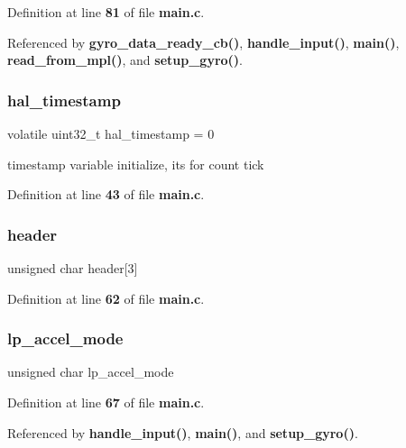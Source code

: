 Definition at line \textbf{ 81} of file \textbf{ main.\+c}.



Referenced by \textbf{ gyro\+\_\+data\+\_\+ready\+\_\+cb()}, \textbf{ handle\+\_\+input()}, \textbf{ main()}, \textbf{ read\+\_\+from\+\_\+mpl()}, and \textbf{ setup\+\_\+gyro()}.

\mbox{\label{group__eMPL_ga359d30cf3d94f8046df41f14467c36de}} 
\subsubsection{hal\+\_\+timestamp}
{\footnotesize\ttfamily volatile uint32\+\_\+t hal\+\_\+timestamp = 0}



timestamp variable initialize, its for count tick 



Definition at line \textbf{ 43} of file \textbf{ main.\+c}.

\mbox{\label{group__eMPL_ga4ef9c4b8e1082c8507e6cb1b9c618b87}} 
\subsubsection{header}
{\footnotesize\ttfamily unsigned char header[3]}



Definition at line \textbf{ 62} of file \textbf{ main.\+c}.

\mbox{\label{group__eMPL_gaeb8fb45fc306b199be68b3f61940fbb0}} 
\subsubsection{lp\+\_\+accel\+\_\+mode}
{\footnotesize\ttfamily unsigned char lp\+\_\+accel\+\_\+mode}



Definition at line \textbf{ 67} of file \textbf{ main.\+c}.



Referenced by \textbf{ handle\+\_\+input()}, \textbf{ main()}, and \textbf{ setup\+\_\+gyro()}.

\mbox{\label{group__eMPL_gafb031e775df5d8654f1ac1170378eb8d}} 
